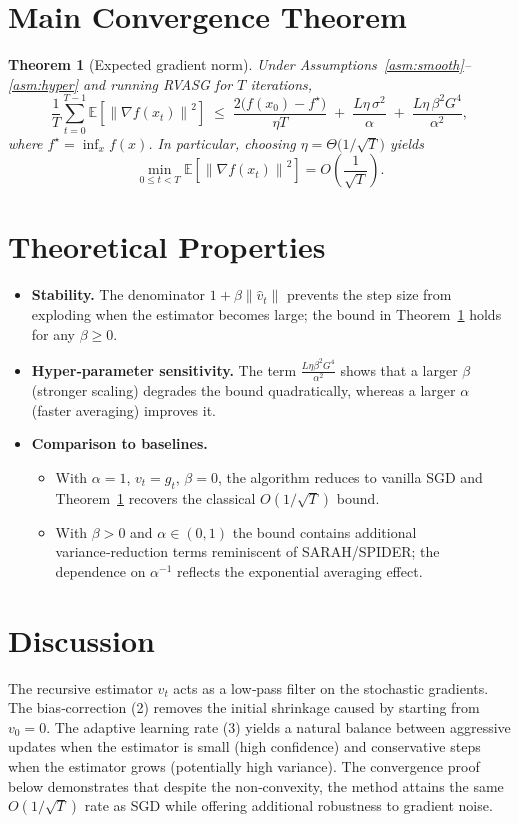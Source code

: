 \documentclass{article}
\newtheorem{theorem}{Theorem}
\newcommand{\E}{\mathbb{E}}
\newcommand{\norm}[1]{\left\lVert#1\right\rVert}
\begin{document}
\section*{Main Convergence Theorem}
\begin{theorem}[Expected gradient norm]\label{thm:main}
Under Assumptions~\ref{asm:smooth}–\ref{asm:hyper} and running RVASG for $T$ iterations,
\[
\frac{1}{T}\sum_{t=0}^{T-1}\E\!\left[\norm{\nabla f(x_t)}^2\right]
\;\le\;
\frac{2\bigl(f(x_0)-f^\star\bigr)}{\eta T}
\;+\;
\frac{L\eta\,\sigma^2}{\alpha}
\;+\;
\frac{L\eta\,\beta^2 G^4}{\alpha^2},
\]
where $f^\star=\inf_x f(x)$. In particular, choosing $\eta = \Theta\!\bigl(1/\sqrt{T}\bigr)$ yields
\[
\min_{0\le t<T}\E\!\left[\norm{\nabla f(x_t)}^2\right]=O\!\left(\frac{1}{\sqrt{T}}\right).
\]
\end{theorem}

\section*{Theoretical Properties}
\begin{itemize}
\item \textbf{Stability.} The denominator $1+\beta\norm{\hat v_t}$ prevents the step size from exploding when the estimator becomes large; the bound in Theorem~\ref{thm:main} holds for any $\beta\ge0$.
\item \textbf{Hyper‑parameter sensitivity.} The term $\frac{L\eta\beta^2 G^4}{\alpha^2}$ shows that a larger $\beta$ (stronger scaling) degrades the bound quadratically, whereas a larger $\alpha$ (faster averaging) improves it.
\item \textbf{Comparison to baselines.}
    \begin{itemize}
    \item With $\alpha=1$, $v_t=g_t$, $\beta=0$, the algorithm reduces to vanilla SGD and Theorem~\ref{thm:main} recovers the classical $O(1/\sqrt{T})$ bound.
    \item With $\beta>0$ and $\alpha\in(0,1)$ the bound contains additional variance‑reduction terms reminiscent of SARAH/SPIDER; the dependence on $\alpha^{-1}$ reflects the exponential averaging effect.
    \end{itemize}
\end{itemize}

\section*{Discussion}
The recursive estimator $v_t$ acts as a low‑pass filter on the stochastic gradients. The bias‑correction (2) removes the initial shrinkage caused by starting from $v_0=0$. The adaptive learning rate (3) yields a natural balance between aggressive updates when the estimator is small (high confidence) and conservative steps when the estimator grows (potentially high variance). The convergence proof below demonstrates that despite the non‑convexity, the method attains the same $O(1/\sqrt{T})$ rate as SGD while offering additional robustness to gradient noise.
\end{document}
